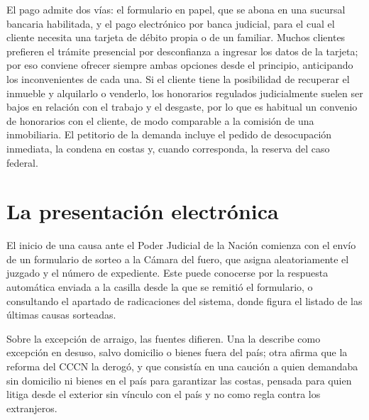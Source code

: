 \documentclass[12pt,oneside]{book}
\begin{document}
El pago admite dos vías: el formulario en papel, que se abona en una sucursal bancaria habilitada, y el pago electrónico por banca judicial, para el cual el cliente necesita una tarjeta de débito propia o de un familiar. Muchos clientes prefieren el trámite presencial por desconfianza a ingresar los datos de la tarjeta; por eso conviene ofrecer siempre ambas opciones desde el principio, anticipando los inconvenientes de cada una. Si el cliente tiene la posibilidad de recuperar el inmueble y alquilarlo o venderlo, los honorarios regulados judicialmente suelen ser bajos en relación con el trabajo y el desgaste, por lo que es habitual un convenio de honorarios con el cliente, de modo comparable a la comisión de una inmobiliaria. El petitorio de la demanda incluye el pedido de desocupación inmediata, la condena en costas y, cuando corresponda, la reserva del caso federal.

\section{La presentación electrónica}

El inicio de una causa ante el Poder Judicial de la Nación comienza con el envío de un formulario de sorteo a la Cámara del fuero, que asigna aleatoriamente el juzgado y el número de expediente. Este puede conocerse por la respuesta automática enviada a la casilla desde la que se remitió el formulario, o consultando el apartado de radicaciones del sistema, donde figura el listado de las últimas causas sorteadas.

\begin{note}
Sobre la excepción de arraigo, las fuentes difieren. Una la describe como excepción en desuso, salvo domicilio o bienes fuera del país; otra afirma que la reforma del CCCN la derogó, y que consistía en una caución a quien demandaba sin domicilio ni bienes en el país para garantizar las costas, pensada para quien litiga desde el exterior sin vínculo con el país y no como regla contra los extranjeros.
\end{note}
\end{document}
